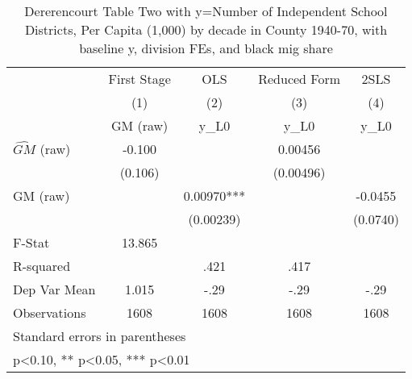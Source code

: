 \begin{table}[htbp]\centering
\def\sym#1{\ifmmode^{#1}\else\(^{#1}\)\fi}
\caption{Dererencourt Table Two with y=Number of Independent School Districts, Per Capita (1,000) by decade in County 1940-70, with baseline y, division FEs, and black mig share}
\begin{tabular}{l*{4}{c}}
\toprule
                    & First Stage   &         OLS   &Reduced Form   &        2SLS   \\
                    &\multicolumn{1}{c}{(1)}&\multicolumn{1}{c}{(2)}&\multicolumn{1}{c}{(3)}&\multicolumn{1}{c}{(4)}\\
                    &\multicolumn{1}{c}{GM  (raw)}&\multicolumn{1}{c}{y\_L0}&\multicolumn{1}{c}{y\_L0}&\multicolumn{1}{c}{y\_L0}\\
\midrule
$\hat{GM}$ (raw)    &      -0.100   &               &     0.00456   &               \\
                    &     (0.106)   &               &   (0.00496)   &               \\
\addlinespace
GM  (raw)           &               &     0.00970***&               &     -0.0455   \\
                    &               &   (0.00239)   &               &    (0.0740)   \\
\midrule
F-Stat              &      13.865   &               &               &               \\
R-squared           &               &        .421   &        .417   &               \\
Dep Var Mean        &       1.015   &        -.29   &        -.29   &        -.29   \\
Observations        &        1608   &        1608   &        1608   &        1608   \\
\bottomrule
\multicolumn{5}{l}{\footnotesize Standard errors in parentheses}\\
\multicolumn{5}{l}{\footnotesize * p<0.10, ** p<0.05, *** p<0.01}\\
\end{tabular}
\end{table}
